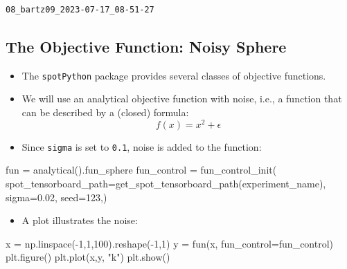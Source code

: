 \documentclass[
  letterpaper,
  DIV=11,
  numbers=noendperiod]{scrreprt}
\newenvironment{Shaded}{\begin{snugshade}}{\end{snugshade}}
\newcommand{\DecValTok}[1]{\textcolor[rgb]{0.68,0.00,0.00}{#1}}
\newcommand{\FloatTok}[1]{\textcolor[rgb]{0.68,0.00,0.00}{#1}}
\newcommand{\NormalTok}[1]{\textcolor[rgb]{0.00,0.23,0.31}{#1}}
\newcommand{\OperatorTok}[1]{\textcolor[rgb]{0.37,0.37,0.37}{#1}}
\newcommand{\StringTok}[1]{\textcolor[rgb]{0.13,0.47,0.30}{#1}}
\providecommand{\tightlist}{%
  \setlength{\itemsep}{0pt}\setlength{\parskip}{0pt}}\usepackage{longtable,booktabs,array}
\begin{document}
\begin{verbatim}
08_bartz09_2023-07-17_08-51-27
\end{verbatim}

\hypertarget{the-objective-function-noisy-sphere}{%
\subsection{The Objective Function: Noisy
Sphere}\label{the-objective-function-noisy-sphere}}

\begin{itemize}
\item
  The \texttt{spotPython} package provides several classes of objective
  functions.
\item
  We will use an analytical objective function with noise, i.e., a
  function that can be described by a (closed) formula:
  \[f(x) = x^2 + \epsilon\]
\item
  Since \texttt{sigma} is set to \texttt{0.1}, noise is added to the
  function:
\end{itemize}

\begin{Shaded}
\begin{Highlighting}[]
\NormalTok{fun }\OperatorTok{=}\NormalTok{ analytical().fun\_sphere}
\NormalTok{fun\_control }\OperatorTok{=}\NormalTok{ fun\_control\_init(}
\NormalTok{    spot\_tensorboard\_path}\OperatorTok{=}\NormalTok{get\_spot\_tensorboard\_path(experiment\_name),}
\NormalTok{    sigma}\OperatorTok{=}\FloatTok{0.02}\NormalTok{,}
\NormalTok{    seed}\OperatorTok{=}\DecValTok{123}\NormalTok{,)}
\end{Highlighting}
\end{Shaded}

\begin{itemize}
\tightlist
\item
  A plot illustrates the noise:
\end{itemize}

\begin{Shaded}
\begin{Highlighting}[]
\NormalTok{x }\OperatorTok{=}\NormalTok{ np.linspace(}\OperatorTok{{-}}\DecValTok{1}\NormalTok{,}\DecValTok{1}\NormalTok{,}\DecValTok{100}\NormalTok{).reshape(}\OperatorTok{{-}}\DecValTok{1}\NormalTok{,}\DecValTok{1}\NormalTok{)}
\NormalTok{y }\OperatorTok{=}\NormalTok{ fun(x, fun\_control}\OperatorTok{=}\NormalTok{fun\_control)}
\NormalTok{plt.figure()}
\NormalTok{plt.plot(x,y, }\StringTok{"k"}\NormalTok{)}
\NormalTok{plt.show()}
\end{Highlighting}
\end{Shaded}
\end{document}
